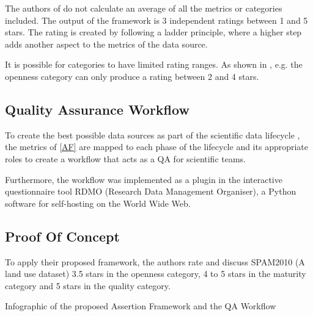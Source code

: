 \documentclass[conference]{IEEEtran}
\begin{document}
The authors of \cite{wagner2022quality} do not calculate an average of all the metrics or categories included. The output of the framework is 3 independent ratings between 1 and 5 stars.  The rating is created by following a ladder principle, where a higher step adds another aspect to the metrics of the data source.

It is possible for categories to have limited rating ranges. As shown in \cite{wagner2022quality}, e.g. the openness category can only produce a rating between 2 and 4 stars.

\subsection{Quality Assurance Workflow}\label{QAW}

To create the best possible data sources as part of the scientific data lifecycle \cite{wagner2022quality}, the metrics of \ref{AF} are mapped to each phase of the lifecycle and its appropriate roles to create a workflow that acts as a QA for scientific teams.

Furthermore, the workflow was implemented as a plugin in the interactive questionnaire tool RDMO (Research Data Management Organiser), a Python software for self-hosting on the World Wide Web.

\subsection{Proof Of Concept}\label{POC}

To apply their proposed framework, the authors rate and discuss SPAM2010 (A land use dataset) 3.5 stars in the openness category, 4 to 5 stars in the maturity category and 5 stars in the quality category.




\renewcommand{\refname}{Appendix}

\begin{thebibliography}{00}
\makeatletter
\addtocounter{\@listctr}{2}
\makeatother
{} Infographic of the proposed Assertion Framework and the QA Workflow
\end{thebibliography}
\end{document}
